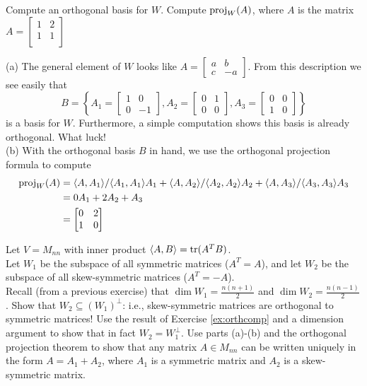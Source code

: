 \bb
\ii Compute an orthogonal basis for $W$. 
\ii Compute $\proj{A}{W}$, where $A$ is the matrix $A=\begin{bmatrix}
1&2\\
1&1\\
\end{bmatrix}
$
\ee
\begin{solution}
\noindent  
(a) The general element of $W$ looks like $A=\begin{bmatrix}
a&b\\
c&-a
\end{bmatrix}$. From this description we see easily that 
\[
B=\left\{ 
A_1=\begin{bmatrix}
1&0\\
0&-1
\end{bmatrix}, 
A_2=\begin{bmatrix}
0&1\\
0&0
\end{bmatrix},
A_3=\begin{bmatrix}
0&0\\
1&0
\end{bmatrix}
\right\}
\]
is a basis for $W$. Furthermore, a simple computation shows this basis is already orthogonal. What luck! 
\\
(b) With the orthogonal basis $B$ in hand, we use the orthogonal projection formula to compute 
\begin{align*}
\proj{A}{W}&=\angvec{A,A_1}/\angvec{A_1,A_1} A_1+\angvec{A,A_2}/\angvec{A_2,A_2} A_2+\angvec{A,A_3}/\angvec{A_3,A_3} A_3\\
&=0A_1+2A_2+A_3\\
&=\begin{bmatrix}
0&2\\
1&0
\end{bmatrix}
\end{align*}
\end{solution}
\ii Let $V=M_{nn}$ with inner product $\angvec{A,B}=\tr(A^TB)$.
\\
Let $W_1$ be the subspace of all symmetric matrices ($A^T=A$), and let $W_2$ be the subspace of all skew-symmetric matrices ($A^T=-A$). 
\\
Recall (from a previous exercise) that $\dim W_1=\frac{n(n+1)}{2}$ and $\dim W_2=\frac{n(n-1)}{2}$. 
\bb
\ii Show that $W_2\subseteq (W_1)^\perp$: i.e., skew-symmetric matrices are orthogonal to symmetric matrices!
\ii Use the result of Exercise \ref{ex:orthcomp} and a dimension argument to show that in fact $W_2=W_1^\perp$. 
\ii Use parts (a)-(b) and the orthogonal projection theorem to show that any matrix $A\in M_{nn}$ can be written uniquely in the form $A=A_1+A_2$, where $A_1$ is a symmetric matrix and $A_2$ is a skew-symmetric matrix. 
